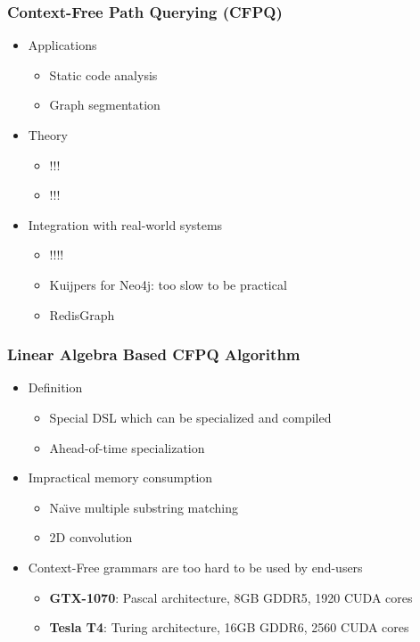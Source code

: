 \documentclass[xcolor=table,aspectratio=169]{beamer}
\begin{document}
\begin{frame}[fragile] \frametitle{Context-Free Path Querying (CFPQ)}
   \begin{itemize}
    \item Applications
    \begin{itemize}
      \item Static code analysis
      \item Graph segmentation
    \end{itemize}
    \item Theory
    \begin{itemize}
      \item !!!
      \item !!!
    \end{itemize}
    \pause
    \item Integration with real-world systems
    \begin{itemize}
      \item !!!!
      \item Kuijpers for Neo4j: too slow to be practical
      \pause
      \item RedisGraph
    \end{itemize}

  \end{itemize}
\end{frame}

\begin{frame}[fragile] \frametitle{Linear Algebra Based CFPQ Algorithm}
  \begin{itemize}
    \item Definition
    \begin{itemize}
      \item Special DSL which can be specialized and compiled
      \item Ahead-of-time specialization
    \end{itemize}
    \item Impractical memory consumption
    \begin{itemize}
      \item Na\"{\i}ve multiple substring matching
      \item 2D convolution
    \end{itemize}
    \item Context-Free grammars are too hard to be used by end-users
    \begin{itemize}
      \item \textbf{GTX-1070}: Pascal architecture, 8GB GDDR5, 1920 CUDA cores
      \item \textbf{Tesla T4}: Turing architecture, 16GB GDDR6, 2560 CUDA cores
    \end{itemize}

  \end{itemize}
\end{frame}
\end{document}
